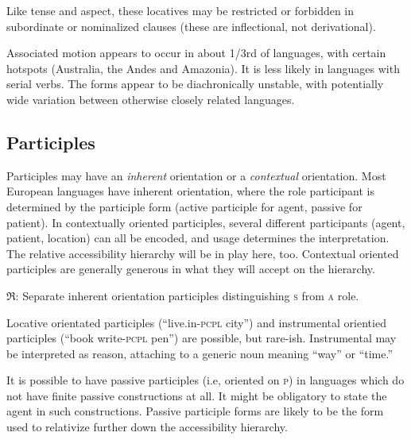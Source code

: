 \documentclass[11pt]{article}
\newcommand{\I}[1]{\textsc{#1}}   %
\newcommand{\rara}[1]{$\mathfrak{R}$: #1}
\begin{document}
Like tense and aspect, these locatives may be restricted or forbidden
in subordinate or nominalized clauses (these are inflectional, not
derivational). 

Associated motion appears to occur in about 1/3rd of languages, with
certain hotspots (Australia, the Andes and Amazonia).  It is less
likely in languages with serial verbs.  The forms appear to be
diachronically unstable, with potentially wide variation between
otherwise closely related languages.


\subsection{Participles}
Participles may have an \textit{inherent} orientation or a
\textit{contextual} orientation.  Most European languages have
inherent orientation, where the role participant is determined by the
participle form (active participle for agent, passive for patient).
In contextually oriented participles, several different participants
(agent, patient, location) can all be encoded, and usage determines
the interpretation.  The relative accessibility hierarchy will be in
play here, too.  Contextual oriented participles are generally
generous in what they will accept on the hierarchy.

\rara{Separate inherent orientation participles distinguishing \I{s}
from \I{a} role.}

Locative orientated participles (``live.in-\I{pcpl} city'') and
instrumental orientied participles (``book write-\I{pcpl} pen'') are
possible, but rare-ish.  Instrumental may be interpreted as reason,
attaching to a generic noun meaning ``way'' or ``time.''

It is possible to have passive participles (i.e, oriented on \I{p}) in
languages which do not have finite passive constructions at all.  It
might be obligatory to state the agent in such constructions.  Passive
participle forms are likely to be the form used to relativize further
down the accessibility hierarchy.
\end{document}
